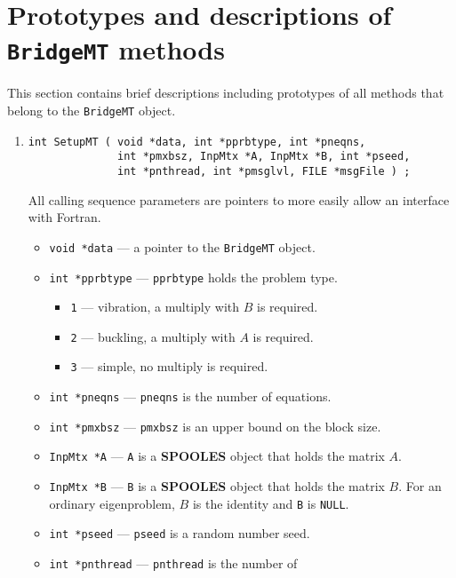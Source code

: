 \section{Prototypes and descriptions of \texttt{BridgeMT} methods}
\label{section:BridgeMT:proto}
\par
This section contains brief descriptions including prototypes
of all methods that belong to the {\tt BridgeMT} object.
\par
\begin{enumerate}
\item
\begin{verbatim}
int SetupMT ( void *data, int *pprbtype, int *pneqns, 
              int *pmxbsz, InpMtx *A, InpMtx *B, int *pseed, 
              int *pnthread, int *pmsglvl, FILE *msgFile ) ;
\end{verbatim}
\noindent All calling sequence parameters are pointers to more
easily allow an interface with Fortran.
\begin{itemize}
\item {\tt void *data} --- a pointer to the {\tt BridgeMT} object.
\item {\tt int *pprbtype} --- {\tt *pprbtype} holds the problem type.
   \begin{itemize}
   \item {\tt 1} --- vibration, a multiply with $B$ is required.
   \item {\tt 2} --- buckling, a multiply with $A$ is required.
   \item {\tt 3} --- simple, no multiply is required.
   \end{itemize}
\item {\tt int *pneqns} --- {\tt *pneqns} is the number of equations.
\item {\tt int *pmxbsz} --- {\tt *pmxbsz} is an upper bound on the
block size.
\item {\tt InpMtx *A} --- {\tt A} is a {\bf SPOOLES} object that
holds the matrix $A$.
\item {\tt InpMtx *B} --- {\tt B} is a {\bf SPOOLES} object that
holds the matrix $B$. For an ordinary eigenproblem, $B$ is the
identity and {\tt B} is {\tt NULL}.
\item {\tt int *pseed} --- {\tt *pseed} is a random number seed.
\item {\tt int *pnthread} --- {\tt *pnthread} is the number of

\end{itemize}
\end{enumerate}
